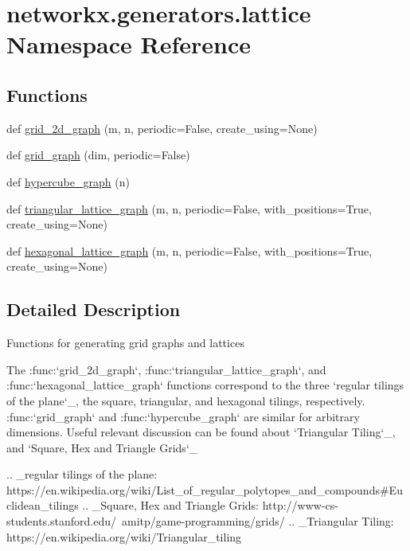 \hypertarget{namespacenetworkx_1_1generators_1_1lattice}{}\section{networkx.\+generators.\+lattice Namespace Reference}
\label{namespacenetworkx_1_1generators_1_1lattice}
\subsection*{Functions}
\begin{DoxyCompactItemize}
\item 
def \hyperlink{namespacenetworkx_1_1generators_1_1lattice_a5840a7b13a29e53505d6e5a96e01db2b}{grid\+\_\+2d\+\_\+graph} (m, n, periodic=False, create\+\_\+using=None)
\item 
def \hyperlink{namespacenetworkx_1_1generators_1_1lattice_a2233c49114639acd7739d43b03e64f2c}{grid\+\_\+graph} (dim, periodic=False)
\item 
def \hyperlink{namespacenetworkx_1_1generators_1_1lattice_a171ac7782fc671aa9e32e0eb9f3306f5}{hypercube\+\_\+graph} (n)
\item 
def \hyperlink{namespacenetworkx_1_1generators_1_1lattice_a5022c00f55ea30c6ae2178224232131f}{triangular\+\_\+lattice\+\_\+graph} (m, n, periodic=False, with\+\_\+positions=True, create\+\_\+using=None)
\item 
def \hyperlink{namespacenetworkx_1_1generators_1_1lattice_aa7e6e82829e0ed987ca3d9651ba549d2}{hexagonal\+\_\+lattice\+\_\+graph} (m, n, periodic=False, with\+\_\+positions=True, create\+\_\+using=None)
\end{DoxyCompactItemize}


\subsection{Detailed Description}
\begin{DoxyVerb}Functions for generating grid graphs and lattices

The :func:`grid_2d_graph`, :func:`triangular_lattice_graph`, and
:func:`hexagonal_lattice_graph` functions correspond to the three
`regular tilings of the plane`_, the square, triangular, and hexagonal
tilings, respectively. :func:`grid_graph` and :func:`hypercube_graph`
are similar for arbitrary dimensions. Useful relevant discussion can
be found about `Triangular Tiling`_, and `Square, Hex and Triangle Grids`_

.. _regular tilings of the plane: https://en.wikipedia.org/wiki/List_of_regular_polytopes_and_compounds#Euclidean_tilings
.. _Square, Hex and Triangle Grids: http://www-cs-students.stanford.edu/~amitp/game-programming/grids/
.. _Triangular Tiling: https://en.wikipedia.org/wiki/Triangular_tiling\end{DoxyVerb}
 


